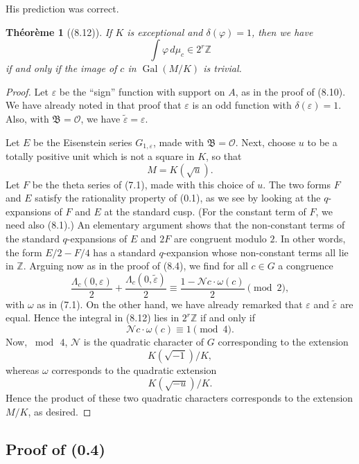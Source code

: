 \documentclass[12pt,a4paper]{article}
\theoremstyle{plain}
\newtheorem{theorem}{Th\'{e}or\`{e}me}[section]
\theoremstyle{definition}
\theoremstyle{remark}
\DeclareMathOperator{\Gal}{Gal}
\begin{document}
His prediction was correct.

\begin{theorem}[(8.12)]\label{thm:8.12}
If $K$ is exceptional and $\delta(\varphi) = 1$, then we have
\[
\int \varphi \, d\mu_c \in 2^r\mathbb{Z}
\]
if and only if the image of $c$ in $\Gal(M/K)$ is trivial.
\end{theorem}

\begin{proof}
Let $\varepsilon$ be the ``sign'' function with support on $A$, as in the proof of (8.10). We have already noted in that proof that $\varepsilon$ is an odd function with $\delta(\varepsilon) = 1$. Also, with $\mathfrak{B} = \mathcal{O}$, we have $\tilde{\varepsilon} = \varepsilon$.

Let $E$ be the Eisenstein series $G_{1,\varepsilon}$, made with $\mathfrak{B} = \mathcal{O}$. Next, choose $u$ to be a totally positive unit which is not a square in $K$, so that
\[
M = K(\sqrt{u}).
\]
Let $F$ be the theta series of (7.1), made with this choice of $u$. The two forms $F$ and $E$ satisfy the rationality property of (0.1), as we see by looking at the $q$-expansions of $F$ and $E$ at the standard cusp. (For the constant term of $F$, we need also (8.1).) An elementary argument shows that the non-constant terms of the standard $q$-expansions of $E$ and $2F$ are congruent modulo $2$. In other words, the form $E/2 - F/4$ has a standard $q$-expansion whose non-constant terms all lie in $\mathbb{Z}$. Arguing now as in the proof of (8.4), we find for all $c \in G$ a congruence
\[
\frac{\varLambda_c(0, \varepsilon)}{2} + \frac{\varLambda_c(0, \tilde{\varepsilon})}{2} \equiv \frac{1 - \mathcal{N}c \cdot \omega(c)}{2} \pmod{2},
\]
with $\omega$ as in (7.1). On the other hand, we have already remarked that $\varepsilon$ and $\tilde{\varepsilon}$ are equal. Hence the integral in (8.12) lies in $2^r\mathbb{Z}$ if and only if
\[
\mathcal{N}c \cdot \omega(c) \equiv 1 \pmod{4}.
\]
Now, $\bmod\, 4$, $\mathcal{N}$ is the quadratic character of $G$ corresponding to the extension
\[
K(\sqrt{-1})/K,
\]
whereas $\omega$ corresponds to the quadratic extension
\[
K(\sqrt{-u})/K.
\]
Hence the product of these two quadratic characters corresponds to the extension $M/K$, as desired.
\end{proof}

\subsection*{Proof of (0.4)}
\end{document}
